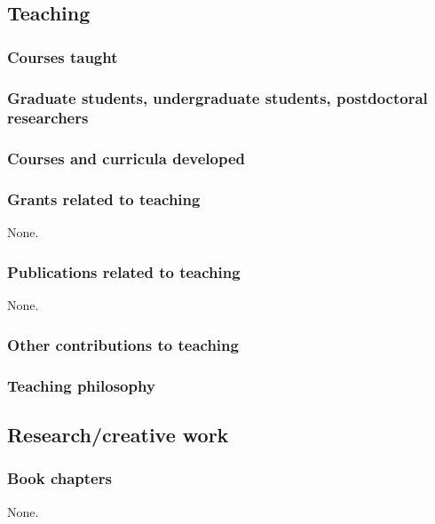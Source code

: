 \subsection{Teaching}

\subsubsection{Courses taught}


\subsubsection{Graduate students, undergraduate students, postdoctoral researchers}








\subsubsection{Courses and curricula developed}


\subsubsection{Grants related to teaching}
None.

\subsubsection{Publications related to teaching}
None.

\subsubsection{Other contributions to teaching}

\subsubsection{Teaching philosophy}


\subsection{Research/creative work}

\subsubsection{Book chapters}
None.


